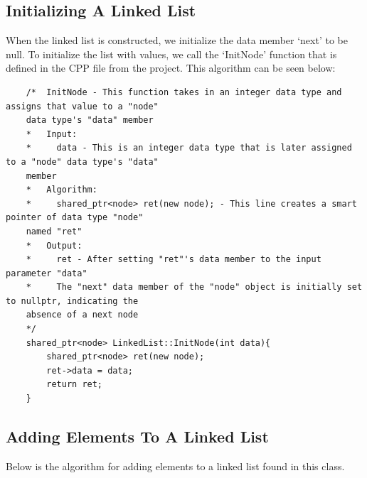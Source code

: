 \documentclass[a4paper,9pt]{article}
\begin{document}
\subsection*{Initializing A Linked List}

When the linked list is constructed, we initialize the data member `next' to be null. To initialize the list 
with values, we call
the `InitNode' function that is defined in the CPP file from the project. This algorithm can be seen below:

\begin{highlight}

    \begin{verbatim}
    /*  InitNode - This function takes in an integer data type and assigns that value to a "node" 
    data type's "data" member
    *   Input:
    *     data - This is an integer data type that is later assigned to a "node" data type's "data" 
    member
    *   Algorithm:
    *     shared_ptr<node> ret(new node); - This line creates a smart pointer of data type "node" 
    named "ret"
    *   Output:
    *     ret - After setting "ret"'s data member to the input parameter "data"
    *     The "next" data member of the "node" object is initially set to nullptr, indicating the 
    absence of a next node
    */
    shared_ptr<node> LinkedList::InitNode(int data){
        shared_ptr<node> ret(new node);
        ret->data = data;
        return ret;
    }
    \end{verbatim}

\end{highlight}

\subsection*{Adding Elements To A Linked List}

Below is the algorithm for adding elements to a linked list found in this class.
\end{document}
